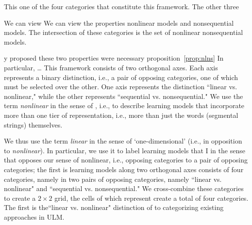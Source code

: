 {This one of the four categories that constitute this framework. The other three 

We can view We can view the properties nonlinear models and nonsequential models. The intersection of these categories is the set of nonlinear nonsequential models. 

y  proposed these two properties were necessary proposition~\ref{prop:nlns} 
 In particular, \dots
This framework consists of two orthogonal axes. Each axis represents a binary distinction, i.e., 
a pair of opposing categories, one of which must be selected over the other. One axis represents 
the distinction ``linear vs. nonlinear," while the other represents ``sequential vs. nonsequential." 
We use the term \emph{nonlinear} in the sense of \citep{mccarthy:1981, goldsmith:1976}, i.e., 
to describe learning models that incorporate more than one tier of representation, i.e., more than 
just the words (segmental strings) themselves.

We thus use the term \emph{linear} in the sense of `one-dimensional' (i.e., in opposition to \emph{nonlinear}). 
In particular, we use it to label learning models that  I in the sense that opposes our sense of nonlinear, i.e., 
opposing categories to a pair of opposing categories; the first is learning models along two 
orthogonal axes consists of four categories, namely  in two pairs of opposing categories, namely 
``linear vs. nonlinear" and ``sequential vs. nonsequential." We cross-combine these categories 
to create a $2\times2$ grid, the cells of which represent create a total of four categories. 
The first is the``linear vs. nonlinear" distinction of \citep{mccarthy:1981, goldsmith:1976} 
to categorizing existing approaches in ULM.

}

